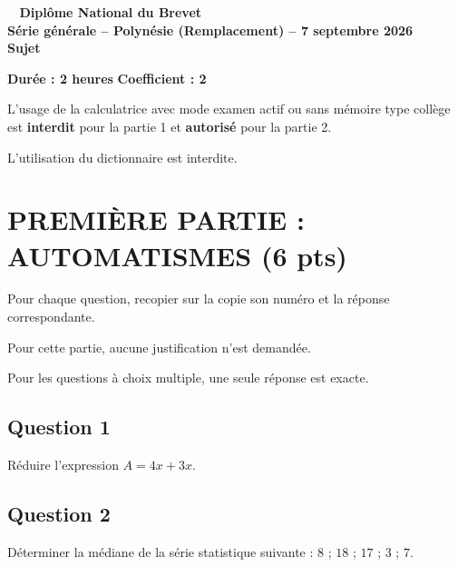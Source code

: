 \documentclass[12pt,a4paper,french]{article}
\begin{document}
\pagestyle{fancy}

\thispagestyle{empty}


\begin{center}
{\Large \textbf{
		\decofourleft~ Diplôme National du Brevet ~\decofourright\\[10pt]
		Série générale -- Polynésie (Remplacement) -- 7 septembre 2026
		\\[10pt]
		Sujet\\[10pt]}}
\end{center}

\begin{center}
\textbf{Durée : 2 heures} \qquad \textbf{Coefficient : 2}
\end{center}

L'usage de la calculatrice avec mode examen actif ou sans mémoire \og type collège \fg{} est \textbf{interdit} pour la partie 1 et \textbf{autorisé} pour la partie 2.

L'utilisation du dictionnaire est interdite.

\bigskip

\section*{\centering PREMIÈRE PARTIE : AUTOMATISMES (6 pts)}

Pour chaque question, recopier sur la copie son numéro et la réponse correspondante.

Pour cette partie, aucune justification n'est demandée.

Pour les questions à choix multiple, une seule réponse est exacte.

\subsection*{Question 1}
Réduire l'expression $A = 4x + 3x$.

\subsection*{Question 2}
Déterminer la médiane de la série statistique suivante : $8$ ; $18$ ; $17$ ; $3$ ; $7$.
\end{document}
